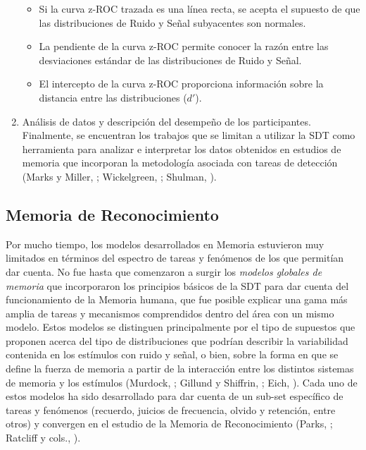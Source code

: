 \begin{enumerate}
\begin{itemize}
\item Si la curva z-ROC trazada es una línea recta, se acepta el supuesto de que las distribuciones de Ruido y Señal subyacentes son normales.\\
\item La pendiente de la curva z-ROC permite conocer la razón entre las desviaciones estándar de las distribuciones de Ruido y Señal.\\
\item El intercepto de la curva z-ROC proporciona información sobre la distancia entre las distribuciones ($d'$).\\
\end{itemize}

\item Análisis de datos y descripción del desempeño de los participantes.\\

Finalmente, se encuentran los trabajos que se limitan a utilizar la SDT como herramienta para analizar e interpretar los datos obtenidos en estudios de memoria que incorporan la metodología asociada con tareas de detección (Marks y Miller, \citeyear{Marks1964}; Wickelgreen, \citeyear{Wickelgren1966_Solo}; Shulman, \citeyear{Schulman1967}).\\
\end{enumerate} 

\subsection{ Memoria de Reconocimiento}

Por mucho tiempo, los modelos desarrollados en Memoria estuvieron muy limitados en términos del espectro de tareas y fenómenos de los que permitían dar cuenta. No fue hasta que comenzaron a surgir los \textit{modelos globales de memoria} que incorporaron los principios básicos de la SDT para dar cuenta del funcionamiento de la Memoria humana, que fue posible explicar una gama más amplia de tareas y mecanismos comprendidos dentro del área con un mismo modelo. Estos modelos se distinguen principalmente por el tipo de supuestos que proponen acerca del tipo de distribuciones que podrían describir la variabilidad contenida en los estímulos con ruido y señal, o bien, sobre la forma en que se define la fuerza de memoria a partir de la interacción entre los distintos sistemas de memoria y los estímulos (Murdock, \citeyear{Murdock1982}; Gillund y Shiffrin, \citeyear{Gillund1984}; Eich, \citeyear{Eich1985}). Cada uno de estos modelos ha sido desarrollado para dar cuenta de un sub-set específico de tareas y fenómenos (recuerdo, juicios de frecuencia, olvido y retención, entre otros) y convergen en el estudio de la Memoria de Reconocimiento (Parks, \citeyear{Parks1966}; Ratcliff y cols., \citeyear{Ratcliff1992}).\\

